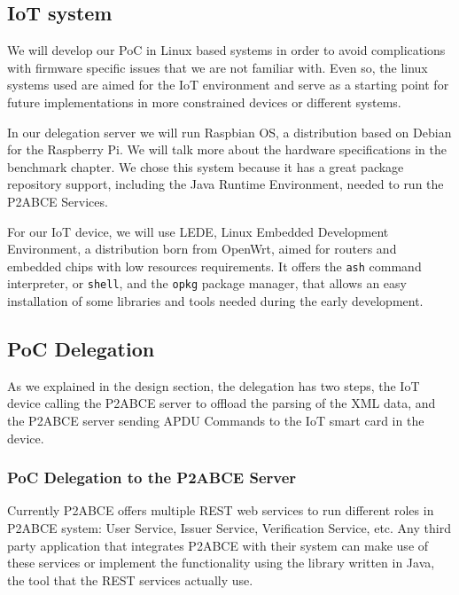 \documentclass[journal]{IEEEtran}
\begin{document}
\subsection{IoT system}

We will develop our PoC in Linux based systems in order to avoid complications with firmware specific issues that we are not familiar with. Even so, the linux systems used are aimed for the IoT environment and serve as a starting point for future implementations in more constrained devices or different systems.

In our delegation server we will run Raspbian OS, a distribution based on Debian for the Raspberry Pi. We will talk more about the hardware specifications in the benchmark chapter. We chose this system because it has a great package repository support, including the Java Runtime Environment, needed to run the P2ABCE Services.

For our IoT device, we will use LEDE, Linux Embedded Development Environment, a distribution born from OpenWrt, aimed for routers and embedded chips with low resources requirements. It offers the \texttt{ash} command interpreter, or \texttt{shell}, and the \texttt{opkg} package manager, that allows an easy installation of some libraries and tools needed during the early development.











\subsection{PoC Delegation}

As we explained in the design section, the delegation has two steps, the IoT device calling the P2ABCE server to offload the parsing of the XML data, and the P2ABCE server sending APDU Commands to the IoT smart card in the device.




\subsubsection{PoC Delegation to the P2ABCE Server}


Currently P2ABCE offers multiple REST web services to run different roles in P2ABCE system: User Service, Issuer Service, Verification Service, etc. Any third party application that integrates P2ABCE with their system can make use of these services or implement the functionality using the library written in Java, the tool that the REST services actually use.
\end{document}
